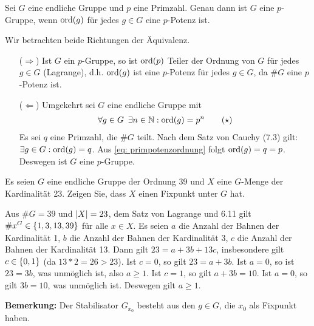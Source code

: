 \begin{exercisePage}
\begin{exercise}[Präsenz]
	Sei $G$ eine endliche Gruppe und $p$ eine Primzahl. Genau dann ist $G$ eine $p$-Gruppe, wenn $\operatorname{ord}(g)$ für jedes $g \in G$ eine $p$-Potenz ist.
\end{exercise}
\begin{solution}
	Wir betrachten beide Richtungen der Äquivalenz.
	\begin{itemize}
		\item[($\Rightarrow$)] Ist $G$ ein $p$-Gruppe, so ist $\operatorname{ord}(p)$ Teiler der Ordnung von $G$ für jedes $g \in G$ (Lagrange), d.h. $\operatorname{ord}(g)$ ist eine $p$-Potenz für jedes $g \in G$, da $\# G$ eine $p$-Potenz ist.
		\item [($\Leftarrow$)] Umgekehrt sei $G$ eine endliche Gruppe mit 
		\begin{align} \label{eq: primpotenzordnung}
			\forall g \in G \enspace \exists n \in \mathbb{N}: \operatorname{ord}(g) = p^n \tag{$\star$}
		\end{align}
		Es sei $q$ eine Primzahl, die $\# G$ teilt. Nach dem Satz von Cauchy (7.3) gilt: $\exists g \in G : \operatorname{ord}(g) = q$. Aus \cref{eq: primpotenzordnung} folgt $\operatorname{ord}(g) = q = p$. Deswegen ist $G$ eine $p$-Gruppe.
	\end{itemize}
\end{solution}
%
\begin{exercise}[Präsenz]
	Es seien $G$ eine endliche Gruppe der Ordnung 39 und $X$ eine $G$-Menge der Kardinalität 23. Zeigen Sie, dass $X$ einen Fixpunkt unter $G$ hat.
\end{exercise}
\begin{solution}
	Aus $\#G =39$ und $\left| X \right| = 23$, dem Satz von Lagrange und 6.11 gilt $\# x^G \in \left\{ 1,3,13,39 \right\}$ für alle $x \in X$. Es seien $a$ die Anzahl der Bahnen der Kardinalität 1, $b$ die Anzahl der Bahnen der Kardinalität 3, $c$ die Anzahl der Bahnen der Kardinalität 13. Dann gilt $23 = a + 3b + 13c$, insbesondere gilt $c \in \left\{ 0,1 \right\}$ (da $13*2 =26 > 23$). Ist $c=0$, so gilt $23=a+3b$. Ist $a=0$, so ist $23 = 3b$, was unmöglich ist, also $a \geq 1$. Ist $c=1$, so gilt $a+3b=10$. Ist $a=0$, so gilt $3b=10$, was unmöglich ist. Deswegen gilt $a \geq 1$.
\end{solution}

\textbf{Bemerkung:} Der Stabilisator $G_{x_0}$ besteht aus den $g \in G$, die $x_0$ als Fixpunkt haben.

\end{exercisePage}